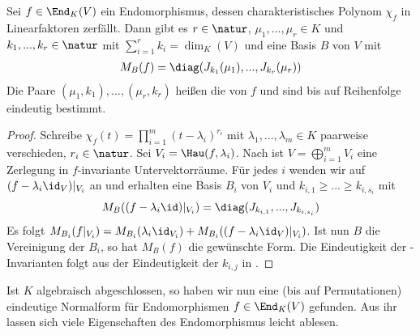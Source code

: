 \begin{theorem}
	Sei $f\in\End_K(V)$ ein Endomorphismus, dessen charakteristisches Polynom $\chi_f$ in Linearfaktoren zerfällt. Dann gibt es $r\in\natur$, $\mu_1,...,\mu_r\in K$ und $k_1,...,k_r\in \natur$ mit $\sum_{i=1}^r k_i=\dim_K(V)$ und eine Basis $B$ von $V$ mit
	\begin{align}
		M_B(f)=\diag(J_{k_1}(\mu_1),...,J_{k_r}(\mu_r))\notag
	\end{align} 
	Die Paare $(\mu_1,k_1),...,(\mu_r,k_r)$ heißen die  von $f$ und sind bis auf Reihenfolge eindeutig bestimmt.
\end{theorem}
\begin{proof}
	Schreibe $\chi_f(t)=\prod_{i=1}^m (t-\lambda_i)^{r_i}$ mit $\lambda_1,...,\lambda_m\in K$ paarweise verschieden, $r_i\in\natur$. Sei $V_i=\Hau(f,\lambda_i)$. Nach  ist $V=\bigoplus_{i=1}^m V_i$ eine Zerlegung in $f$-invariante Untervektorräume. Für jedes $i$ wenden wir  auf $(f-\lambda_i\id_V)\vert_{V_i}$ an und erhalten eine Basis $B_i$ von $V_i$ und $k_{i,1}\ge ...\ge k_{i,s_i}$ mit 
	\begin{align}
		M_B((f-\lambda_i\id)\vert_{V_i})=\diag(J_{k_{i,1}},...,J_{k_{i,s_i}})\notag
	\end{align}
	Es folgt $M_{B_i}(f\vert_{V_i})=M_{B_i}(\lambda_i\id_{V_i})+M_{B_i}((f-\lambda_i\id_V)\vert_{V_i})$. Ist nun $B$ die Vereinigung der $B_i$, so hat $M_B(f)$ die gewünschte Form. Die Eindeutigkeit der -Invarianten folgt aus der Eindeutigkeit der $k_{i,j}$ in .
\end{proof}

\begin{remark}
	Ist $K$ algebraisch abgeschlossen, so haben wir nun eine (bis auf Permutationen) eindeutige Normalform für Endomorphismen $f\in\End_K(V)$ gefunden. Aus ihr lassen sich viele Eigenschaften des Endomorphismus leicht ablesen.
\end{remark}


